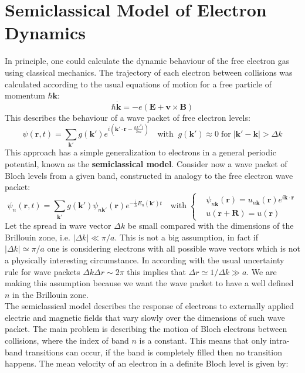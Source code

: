 \documentclass[10.75pt,a4paper,openright,bottom=2cm]{article}
\renewcommand{\Vec}[1]{\boldsymbol{#1}}
\begin{document}
\section{Semiclassical Model of Electron Dynamics}
In principle, one could calculate the dynamic behaviour of the free electron gas using classical mechanics. The trajectory of each electron between collisions was calculated according to the usual equations of motion for a free particle of momentum $\hbar\Vec{k}$:
\begin{equation}
\label{eqmot1}
\hbar\Vec{\Dot{k}}=-e(\Vec{E}+\Vec{v}\times\Vec{B}) %
\end{equation}
This describes the behaviour of a wave packet of free electron levels:
\[
\psi(\Vec{r},t)=\sum_{\Vec{k'}}g(\Vec{k'})e^{i\left(\Vec{k'}\cdot\Vec{r}-\frac{\hbar k'^2t}{2m}\right)} \quad \text{with}\;\;g(\Vec{k'})\approx0\;\text{for}\;|\Vec{k'}-\Vec{k}|>\Delta k
\]
This approach has a simple generalization to electrons in a general periodic potential, known as the \textbf{semiclassical model}. Consider now a wave packet of Bloch levels from a given band, constructed in analogy to the free electron wave packet:
\[
\psi_n(\Vec{r},t)=\sum_{\Vec{k'}}g(\Vec{k'})\psi_{n\Vec{k'}}(\Vec{r})e^{-\frac{i}{h}E_n(\Vec{k'})t} \quad \text{with}\;
\left\{
\begin{aligned}
&\psi_{n\Vec{k}}(\Vec{r})=u_{n\Vec{k}}(\Vec{r})e^{i\Vec{k}\cdot\Vec{r}}\\
&u(\Vec{r}+\Vec{R})=u(\Vec{r})
\end{aligned}
\right.
\]
Let the spread in wave vector $\Delta k$ be small compared with the dimensions of the Brillouin zone, i.e. $|\Delta k|\ll\pi/a$. This is not a big assumption, in fact if $|\Delta k|\simeq\pi/a$ one is considering electrons with all possible wave vectors which is not a physically interesting circumstance. In according with the usual uncertainty rule for wave packets $\Delta k\Delta r\sim2\pi$ this implies that $\Delta r\simeq1/\Delta k\gg a$. We are making this assumption because we want the wave packet to have a well defined $n$ in the  Brillouin zone.\\
The semiclassical model describes the response of electrons to externally applied electric and magnetic fields that vary slowly over the dimensions of such wave packet. The main problem is describing the motion of Bloch electrons between collisions, where the index of band $n$ is a constant. This means that only intra-band transitions can occur, if the band is completely filled then no transition happens. The mean velocity of an electron in a definite Bloch level is given by:
\end{document}
